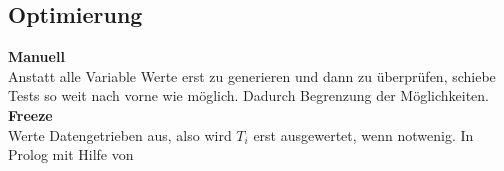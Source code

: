 \subsection{Optimierung}
\textbf{Manuell}\\
Anstatt alle Variable Werte erst zu generieren und dann zu überprüfen, schiebe Tests so weit nach vorne wie möglich.
Dadurch Begrenzung der Möglichkeiten.\\

\textbf{Freeze}\\
Werte Datengetrieben aus, also wird \(T_i\) erst ausgewertet, wenn notwenig.
In Prolog mit Hilfe von 

